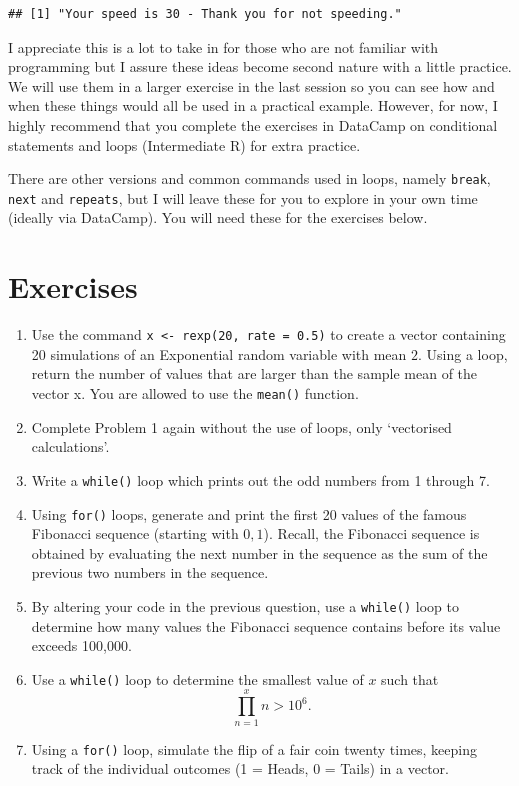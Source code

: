 \documentclass[
]{book}
\theoremstyle{definition}
\theoremstyle{definition}
\theoremstyle{definition}
\theoremstyle{definition}
\theoremstyle{remark}
\begin{document}
\begin{verbatim}
## [1] "Your speed is 30 - Thank you for not speeding."
\end{verbatim}

I appreciate this is a lot to take in for those who are not familiar with programming but I assure these ideas become second nature with a little practice. We will use them in a larger exercise in the last session so you can see how and when these things would all be used in a practical example. However, for now, I highly recommend that you complete the exercises in DataCamp on conditional statements and loops (Intermediate R) for extra practice.

There are other versions and common commands used in loops, namely \texttt{break}, \texttt{next} and \texttt{repeats}, but I will leave these for you to explore in your own time (ideally via DataCamp). You will need these for the exercises below.

\hypertarget{exercises-4}{%
\section{Exercises}\label{exercises-4}}

\begin{enumerate}
\def\labelenumi{\arabic{enumi}.}
\item
  Use the command \texttt{x\ \textless{}-\ rexp(20,\ rate\ =\ 0.5)} to create a vector containing 20 simulations of an Exponential random variable with mean \(2\). Using a loop, return the number of values that are larger than the sample mean of the vector x. You are allowed to use the \texttt{mean()} function.
\item
  Complete Problem 1 again without the use of loops, only `vectorised calculations'.
\item
  Write a \texttt{while()} loop which prints out the odd numbers from 1 through 7.
\item
  Using \texttt{for()} loops, generate and print the first 20 values of the famous Fibonacci sequence (starting with \(0, 1\)). Recall, the Fibonacci sequence is obtained by evaluating the next number in the sequence as the sum of the previous two numbers in the sequence.
\item
  By altering your code in the previous question, use a \texttt{while()} loop to determine how many values the Fibonacci sequence contains before its value exceeds 100,000.
\item
  Use a \texttt{while()} loop to determine the smallest value of \(x\) such that
  \begin{equation*}
  \prod_{n=1}^x n > 10^{6}.
  \end{equation*}
\item
  Using a \texttt{for()} loop, simulate the flip of a fair coin twenty times, keeping track of the individual outcomes (1 = Heads, 0 = Tails) in a vector.
\end{enumerate}
\end{document}
